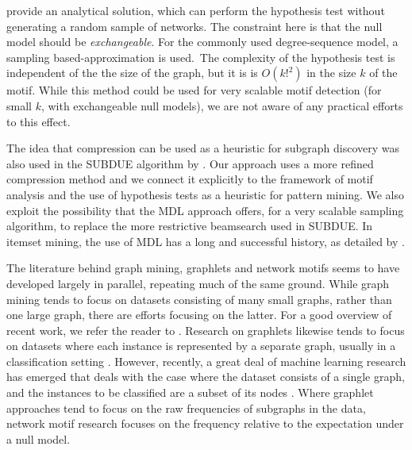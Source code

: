 \documentclass[twoside,11pt]{article}
\begin{document}
\cite{picard2008assessing} provide an analytical solution, which can perform the hypothesis test without generating a random sample of networks. The constraint here is that the null model should be \emph{exchangeable}. For the commonly used degree-sequence model, a sampling based-approximation is used.\footnotemark~The complexity of the hypothesis test is independent of the the size of the graph, but it is is $O(k!^2)$ in the size $k$ of the motif. While this method could be used for very scalable motif detection (for small $k$, with exchangeable null models), we are not aware of any practical efforts to this effect.


The idea that compression can be used as a heuristic for subgraph discovery was also used in the SUBDUE algorithm by \citet{cook1994substructure}. Our approach uses a more refined compression method and we connect it explicitly to the framework of motif analysis and the use of hypothesis tests as a heuristic for pattern mining. We also exploit the possibility that the MDL approach offers, for a very scalable sampling algorithm, to replace the more restrictive beamsearch used in SUBDUE. In itemset mining, the use of MDL has a long and successful history, as detailed by \citet[Chapter~8]{aggarwal2014frequent}.

The literature behind graph mining, graphlets and network motifs seems to have developed largely in parallel, repeating much of the same ground. While graph mining tends to focus on datasets consisting of many small graphs, rather than one large graph, there are efforts focusing on the latter. For a good overview of recent work, we refer the reader to \citet[Chapter~13]{aggarwal2014frequent}. Research on graphlets likewise tends to focus on datasets where each instance is represented by a separate graph, usually in a classification setting \cite{shervashidze2009efficient}. However, recently, a great deal of machine learning research has emerged that deals with the case where the dataset consists of a single graph, and the instances to be classified are a subset of its nodes \citep{pham2016column}. Where graphlet approaches tend to focus on the raw frequencies of subgraphs in the data, network motif research focuses on the frequency relative to the expectation under a null model.  
\end{document}
